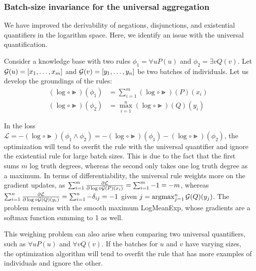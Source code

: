 \documentclass{article}
\theoremstyle{definition}
\begin{document}
\subsubsection{Batch-size invariance for the universal aggregation}
\label{s:batch_aggregation}
We have improved the derivability 
of negations, disjunctions, and existential quantifiers in the logarithm space.
Here, we identify an issue with the universal quantification.

Consider a knowledge base with two rules $\phi_1 = \forall u P(u)$ and $\phi_2 = \exists v Q(v)$.
Let $\mathcal{G}(u) = [x_1, \dots, x_m]$ and $\mathcal{G}(v) = [y_1, \dots, y_n]$ be two batches of individuals.
Let us develop the groundings of the rules:
\begin{align}
\label{eq:batch_inv_forall}     (\log\circ\Gt)(\phi_1) &
         = \sum_{i=1}^m (\log\circ\Gt)(P)(x_i) \\
\label{eq:batch_inv_exists}     (\log\circ\Gt)(\phi_2) &
         = \max_{i=1}^n (\log\circ\Gt)(Q)(y_i) 
\end{align}

In the loss $\mathcal{L} = - (\log\circ\Gt)(\phi_1 \land \phi_2) = - (\log\circ\Gt)(\phi_1) - (\log\circ\Gt)(\phi_2)$,
the optimization will tend to overfit the rule with the universal quantifier and ignore the existential rule for large batch sizes.
This is due to the fact that the first sums $m$ log truth degrees, whereas the second only takes one log truth degree as a maximum.
In terms of differentiability,
the universal rule weights more on the gradient updates, 
as $\sum_{i=1}^m \frac{\partial \mathcal{L}}{\partial \log\circ\mathcal{G}(P)(x_i)} = \sum_{i=1}^m -1 = -m$,
whereas $\sum_{i=1}^n\partialderivative{\mathcal{L}}{\log\circ\G(Q)(y_i)} = \sum_{i=1}^n - \delta_{ij} = -1$ given $j=\operatorname{argmax}_{j=1}^n \mathcal{G}(Q)(y_j)$.
The problem remains with the smooth maximum LogMeanExp, whose gradients are a softmax function summing to 1 as well.%

This weighing problem can also arise when comparing two universal quantifiers, such as $\forall u P(u)$ and $\forall v Q(v)$. %
If the batches for $u$ and $v$ have varying sizes, the optimization algorithm will tend to overfit the rule that has more examples of individuals and ignore the other.
\end{document}
